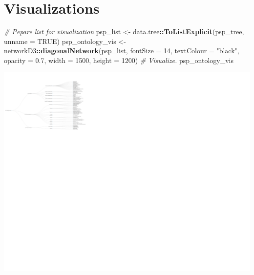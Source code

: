 \documentclass[
]{article}
\newenvironment{Shaded}{\begin{snugshade}}{\end{snugshade}}
\newcommand{\CommentTok}[1]{\textcolor[rgb]{0.56,0.35,0.01}{\textit{#1}}}
\newcommand{\DataTypeTok}[1]{\textcolor[rgb]{0.13,0.29,0.53}{#1}}
\newcommand{\DecValTok}[1]{\textcolor[rgb]{0.00,0.00,0.81}{#1}}
\newcommand{\FloatTok}[1]{\textcolor[rgb]{0.00,0.00,0.81}{#1}}
\newcommand{\KeywordTok}[1]{\textcolor[rgb]{0.13,0.29,0.53}{\textbf{#1}}}
\newcommand{\NormalTok}[1]{#1}
\newcommand{\OperatorTok}[1]{\textcolor[rgb]{0.81,0.36,0.00}{\textbf{#1}}}
\newcommand{\OtherTok}[1]{\textcolor[rgb]{0.56,0.35,0.01}{#1}}
\newcommand{\StringTok}[1]{\textcolor[rgb]{0.31,0.60,0.02}{#1}}
\begin{document}
\hypertarget{visualizations}{%
\section{Visualizations}\label{visualizations}}

\begin{Shaded}
\begin{Highlighting}[]
\CommentTok{# Pepare list for visualization }
\NormalTok{psp_list <-}\StringTok{ }\NormalTok{data.tree}\OperatorTok{::}\KeywordTok{ToListExplicit}\NormalTok{(psp_tree, }\DataTypeTok{unname =} \OtherTok{TRUE}\NormalTok{)}
\NormalTok{psp_ontology_vis <-}\StringTok{ }\NormalTok{networkD3}\OperatorTok{::}\KeywordTok{diagonalNetwork}\NormalTok{(psp_list, }
                         \DataTypeTok{fontSize =} \DecValTok{14}\NormalTok{,}
                         \DataTypeTok{textColour =} \StringTok{"black"}\NormalTok{,}
                         \DataTypeTok{opacity =} \FloatTok{0.7}\NormalTok{,}
                         \DataTypeTok{width =} \DecValTok{1500}\NormalTok{,}
                         \DataTypeTok{height =} \DecValTok{1200}\NormalTok{)}
\CommentTok{# Visualize.}
\NormalTok{psp_ontology_vis}
\end{Highlighting}
\end{Shaded}

\includegraphics{04_tjbrailey_ontology_vis_files/figure-latex/unnamed-chunk-3-1.pdf}
\end{document}
